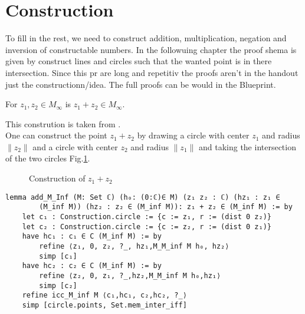 \section{Construction}
To fill in the rest, we need to construct addition, multiplication, negation and inversion of constructable numbers.
In the followuing chapter the proof shema is given by construct lines and circles such that the wanted point is in there intersection. Since this pr are long and repetitiv the proofs aren't in the handout just the constructionn/idea.
The full proofs can be would in the Blueprint.

\begin{lemma}
    \label{lem:construction_add}
    For $z_1, z_2 \in M_{\infty}$ is $z_1 + z_2 \in M_{\infty}$.
\end{lemma}
This constrution is taken from \cite{JAN_SCHROEER:2023}.\\
One can construct the point $z_1 + z_2$ by drawing a circle with center $z_1$ and radius $\|z_2\|$ and a circle with center $z_2$ and radius $\|z_1\|$ and taking the intersection of the two circles Fig.\ref{Fig.2}.

\begin{figure}[h!]
    \centering
    \caption{Construction of $z_1 + z_2$}
    \label{Fig.2}
\end{figure}

\begin{lstlisting}
lemma add_M_Inf (M: Set ℂ) (h₀: (0:ℂ)∈ M) (z₁ z₂ : ℂ) (hz₁ : z₁ ∈ 
        (M_inf M)) (hz₂ : z₂ ∈ (M_inf M)): z₁ + z₂ ∈ (M_inf M) := by
    let c₁ : Construction.circle := {c := z₁, r := (dist 0 z₂)}
    let c₂ : Construction.circle := {c := z₂, r := (dist 0 z₁)}
    have hc₁ : c₁ ∈ C (M_inf M) := by
        refine ⟨z₁, 0, z₂, ?_, hz₁,M_M_inf M h₀, hz₂⟩
        simp [c₁]
    have hc₂ : c₂ ∈ C (M_inf M) := by
        refine ⟨z₂, 0, z₁, ?_,hz₂,M_M_inf M h₀,hz₁⟩
        simp [c₂]
    refine icc_M_inf M ⟨c₁,hc₁, c₂,hc₂, ?_⟩
    simp [circle.points, Set.mem_inter_iff]
\end{lstlisting}

